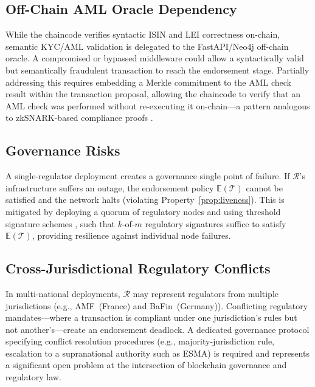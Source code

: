 \documentclass[journal,10pt,twocolumn]{IEEEtran}
\begin{document}
\subsection{Off-Chain AML Oracle Dependency}

While the chaincode verifies syntactic ISIN and LEI correctness on-chain, semantic KYC/AML validation is delegated to the FastAPI/Neo4j off-chain oracle. A compromised or bypassed middleware could allow a syntactically valid but semantically fraudulent transaction to reach the endorsement stage. Partially addressing this requires embedding a Merkle commitment to the AML check result within the transaction proposal, allowing the chaincode to verify that an AML check was performed without re-executing it on-chain---a pattern analogous to zkSNARK-based compliance proofs \cite{ref:zksnark_compliance}.

\subsection{Governance Risks}

A single-regulator deployment creates a governance single point of failure. If $\mathcal{R}$'s infrastructure suffers an outage, the endorsement policy $\mathbb{E}(\mathcal{T})$ cannot be satisfied and the network halts (violating Property~\ref{prop:liveness}). This is mitigated by deploying a quorum of regulatory nodes and using threshold signature schemes \cite{ref:threshold_sig}, such that $k$-of-$m$ regulatory signatures suffice to satisfy $\mathbb{E}(\mathcal{T})$, providing resilience against individual node failures.

\subsection{Cross-Jurisdictional Regulatory Conflicts}

In multi-national deployments, $\mathcal{R}$ may represent regulators from multiple jurisdictions (e.g., AMF~(France) and BaFin~(Germany)). Conflicting regulatory mandates---where a transaction is compliant under one jurisdiction's rules but not another's---create an endorsement deadlock. A dedicated governance protocol specifying conflict resolution procedures (e.g., majority-jurisdiction rule, escalation to a supranational authority such as ESMA) is required and represents a significant open problem at the intersection of blockchain governance and regulatory law.

\end{document}

